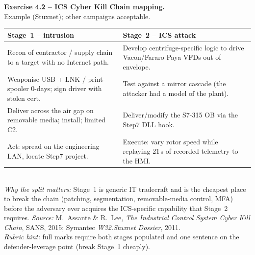 \documentclass[11pt,a4paper]{article}
\begin{document}
\begin{solutionbox}
\textbf{Exercise 4.2 -- ICS Cyber Kill Chain mapping.}\\[2pt]
Example (Stuxnet); other campaigns acceptable.
\par\begin{tabular}{@{}p{7.0cm}p{7.0cm}@{}}
\toprule
\textbf{Stage~1 -- intrusion} & \textbf{Stage~2 -- ICS attack} \\
\midrule
Recon of contractor / supply chain to a target with no Internet path. &
Develop centrifuge-specific logic to drive Vacon/Fararo Paya VFDs out of envelope. \\
Weaponise USB + LNK / print-spooler 0-days; sign driver with stolen cert. &
Test against a mirror cascade (the attacker had a model of the plant). \\
Deliver across the air gap on removable media; install; limited C2. &
Deliver/modify the S7-315 OB via the Step7 DLL hook. \\
Act: spread on the engineering LAN, locate Step7 project. &
Execute: vary rotor speed while replaying 21\,s of recorded telemetry to the HMI. \\
\bottomrule
\end{tabular}\\[3pt]
\emph{Why the split matters:} Stage~1 is generic IT tradecraft and is the cheapest place to break
the chain (patching, segmentation, removable-media control, MFA) before the adversary ever
acquires the ICS-specific capability that Stage~2 requires. \emph{Source:} M.\ Assante \&
R.\ Lee, \emph{The Industrial Control System Cyber Kill Chain}, SANS, 2015; Symantec
\emph{W32.Stuxnet Dossier}, 2011.\\[2pt]
\emph{Rubric hint:} full marks require both stages populated and one sentence on the
defender-leverage point (break Stage~1 cheaply).
\end{solutionbox}
\end{document}
